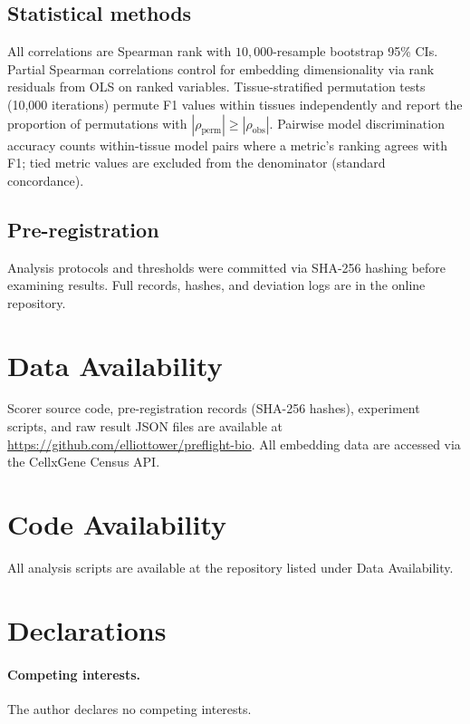 \documentclass[11pt]{article}
\begin{document}
\subsection{Statistical methods}

All correlations are Spearman rank with $10{,}000$-resample bootstrap
95\% CIs. Partial Spearman correlations control for embedding
dimensionality via rank residuals from OLS on ranked variables.
Tissue-stratified permutation tests (10,000 iterations) permute F1
values within tissues independently and report the proportion of
permutations with $|\rho_{\mathrm{perm}}| \geq |\rho_{\mathrm{obs}}|$.
Pairwise model discrimination accuracy counts within-tissue model pairs
where a metric's ranking agrees with F1; tied metric values are excluded
from the denominator (standard concordance).

\subsection{Pre-registration}

Analysis protocols and thresholds were committed via SHA-256 hashing
before examining results. Full records, hashes, and deviation logs are
in the online repository.


\section*{Data Availability}

Scorer source code, pre-registration records (SHA-256 hashes),
experiment scripts, and raw result JSON files are available at
\url{https://github.com/elliottower/preflight-bio}. All embedding data
are accessed via the CellxGene Census API.

\section*{Code Availability}

All analysis scripts are available at the repository listed under Data
Availability.

\section*{Declarations}

\paragraph{Competing interests.} The author declares no competing
interests.
\end{document}
